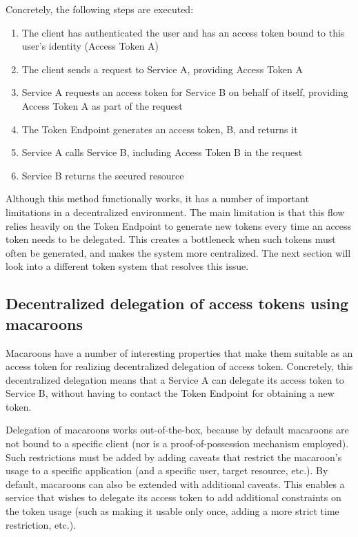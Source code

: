 \noindent Concretely, the following steps are executed:
\begin{enumerate}
    \item The client has authenticated the user and has an access token bound to this user's identity (Access Token A)
    \item The client sends a request to Service A, providing Access Token A
    \item Service A requests an access token for Service B on behalf of itself, providing Access Token A as part of the request
    \item The Token Endpoint generates an access token, B, and returns it
    \item Service A calls Service B, including Access Token B in the request
    \item Service B returns the secured resource
\end{enumerate}
\noindent Although this method functionally works, it has a number of important limitations in a decentralized environment. The main limitation is that this flow relies heavily on the Token Endpoint to generate new tokens every time an access token needs to be delegated. This creates a bottleneck when such tokens must often be generated, and makes the system more centralized. The next section will look into a different token system that resolves this issue.

\subsection{Decentralized delegation of access tokens using macaroons}
Macaroons have a number of interesting properties that make them suitable as an access token for realizing decentralized delegation of access token. Concretely, this decentralized delegation means that a Service A can delegate its access token to Service B, without having to contact the Token Endpoint for obtaining a new token.

Delegation of macaroons works out-of-the-box, because by default macaroons are not bound to a specific client (nor is a proof-of-possession mechanism employed). Such restrictions must be added by adding caveats that restrict the macaroon's usage to a specific application (and a specific user, target resource, etc.). By default, macaroons can also be extended with additional caveats. This enables a service that wishes to delegate its access token to add additional constraints on the token usage (such as making it usable only once, adding a more strict time restriction, etc.).


